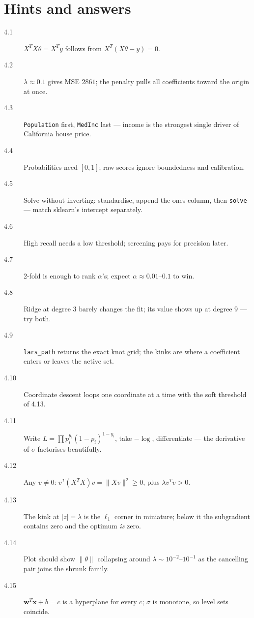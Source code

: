 \section*{Hints and answers}
\begin{description}
\item[4.1] $X^TX\theta = X^Ty$ follows from $X^T(X\theta - y) = 0$.
\item[4.2] $\lambda \approx 0.1$ gives MSE $2861$; the penalty pulls all
  coefficients toward the origin at once.
\item[4.3] \texttt{Population} first, \texttt{MedInc} last --- income is
  the strongest single driver of California house price.
\item[4.4] Probabilities need $[0,1]$; raw scores ignore boundedness and
  calibration.
\item[4.5] Solve without inverting: standardise, append the ones column,
  then \texttt{solve} --- match sklearn's intercept separately.
\item[4.6] High recall needs a low threshold; screening pays for
  precision later.
\item[4.7] 2-fold is enough to rank $\alpha$'s; expect $\alpha \approx
  0.01$--$0.1$ to win.
\item[4.8] Ridge at degree 3 barely changes the fit; its value shows up
  at degree 9 --- try both.
\item[4.9] \texttt{lars\_path} returns the exact knot grid; the kinks are
  where a coefficient enters or leaves the active set.
\item[4.10] Coordinate descent loops one coordinate at a time with the
  soft threshold of 4.13.
\item[4.11] Write $L = \prod p_i^{y_i}(1-p_i)^{1-y_i}$, take
  $-\log$, differentiate --- the derivative of $\sigma$ factorises
  beautifully.
\item[4.12] Any $v \neq 0$: $v^T(X^TX)v = \|Xv\|^2 \ge 0$, plus
  $\lambda v^Tv > 0$.
\item[4.13] The kink at $|z| = \lambda$ is the $\ell_1$ corner in
  miniature; below it the subgradient contains zero and the optimum
  \emph{is} zero.
\item[4.14] Plot should show $\|\theta\|$ collapsing around
  $\lambda \sim 10^{-2}$--$10^{-1}$ as the cancelling pair joins the
  shrunk family.
\item[4.15] $\mathbf{w}^T\mathbf{x} + b = c$ is a hyperplane for every
  $c$; $\sigma$ is monotone, so level sets coincide.
\end{description}
